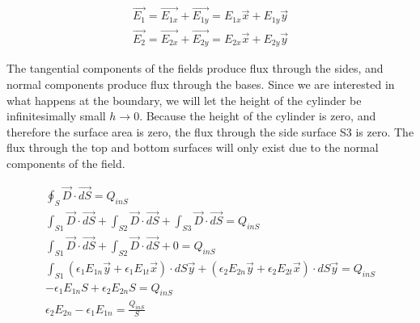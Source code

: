 \documentclass{ximera}
\begin{document}
\begin{eqnarray}
\vec{E_1}= \vec{E_{1x}}+\vec{E_{1y}}= E_{1x} \vec{x}+E_{1y} \vec{y} \\
\vec{E_2}= \vec{E_{2x}}+\vec{E_{2y}}= E_{2x} \vec{x}+E_{2y} \vec{y}
\end{eqnarray}


The tangential components of the fields produce flux through the sides, and normal components produce flux through the bases.  Since we are interested in what happens at the boundary, we will let the height of the cylinder be infinitesimally small $h \rightarrow 0$. Because the height of the cylinder is zero, and therefore the surface area is zero, the flux through the side surface S3 is zero. The flux through the top and bottom surfaces will only exist due to the normal components of the field.

\begin{eqnarray}
\oint_S \vec{D} \cdot \vec{dS} = Q_{inS} \\
\int_{S1} \vec{D} \cdot \vec{dS}  +\int_{S2} \vec{D} \cdot \vec{dS}+\int_{S3} \vec{D} \cdot \vec{dS}  =  Q_{inS} \\
\int_{S1} \vec{D} \cdot \vec{dS}  +\int_{S2} \vec{D} \cdot \vec{dS} +0 = Q_{inS} \\
\int_{S1} (\epsilon_1 E_{1n}\vec{y}+\epsilon_1 E_{1t}\vec{x}) \cdot dS\vec{y}  +(\epsilon_2 E_{2n}\vec{y}+\epsilon_2 E_{2t}\vec{x}) \cdot dS\vec{y} = Q_{inS}\\
-\epsilon_{1} E_{1n} S + \epsilon_2 E_{2n} S = Q_{inS}  \\
\epsilon_2 E_{2n} -\epsilon_{1} E_{1n}= \frac{Q_{inS}}{S} 
\end{eqnarray}
\end{document}
